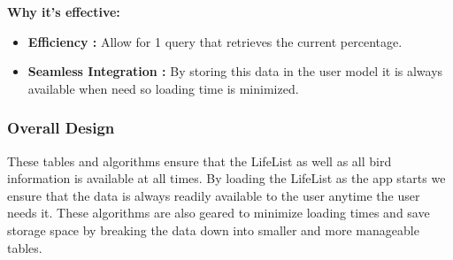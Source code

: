 \documentclass{article}
\begin{document}
\textbf{Why it's effective:}
\begin{itemize}
    \item \textbf{Efficiency :} Allow for 1 query that retrieves the current percentage.
    \item  \textbf{Seamless Integration :} By storing this data in the user model it is always available when need so loading time is minimized.
\end{itemize}

\subsubsection{Overall Design}
These tables and algorithms ensure that the LifeList as well as all bird information is available at all times. By loading the LifeList as the app starts we ensure that the data is always readily available to the user anytime the user needs it. These algorithms are also geared to minimize loading times and save storage space by breaking the data down into smaller and more manageable tables. 
\end{document}
